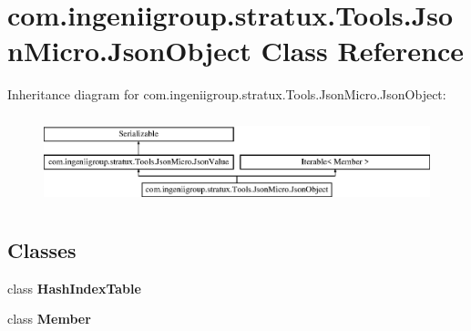 \hypertarget{classcom_1_1ingeniigroup_1_1stratux_1_1_tools_1_1_json_micro_1_1_json_object}{}\section{com.\+ingeniigroup.\+stratux.\+Tools.\+Json\+Micro.\+Json\+Object Class Reference}
\label{classcom_1_1ingeniigroup_1_1stratux_1_1_tools_1_1_json_micro_1_1_json_object}
Inheritance diagram for com.\+ingeniigroup.\+stratux.\+Tools.\+Json\+Micro.\+Json\+Object\+:\begin{figure}[H]
\begin{center}
\leavevmode
\includegraphics[height=2.592592cm]{classcom_1_1ingeniigroup_1_1stratux_1_1_tools_1_1_json_micro_1_1_json_object}
\end{center}
\end{figure}
\subsection*{Classes}
\begin{DoxyCompactItemize}
\item 
class {\bfseries Hash\+Index\+Table}
\item 
class {\bfseries Member}
\end{DoxyCompactItemize}
